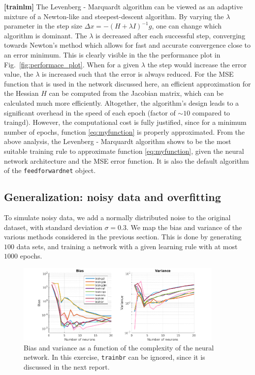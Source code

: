\documentclass[pdftex,11pt,a4paper]{article}
\begin{document}
\textbf{[trainlm]} The Levenberg - Marquardt algorithm can be viewed as an adaptive mixture of a Newton-like and steepest-descent algorithm. By varying the $\lambda$ parameter in the step size $\Delta x = - (H + \lambda I)^{-1} g$, one can change which algorithm is dominant. The $\lambda$ is decreased after each successful step, converging towards Newton's method which allows for fast and accurate convergence close to an error minimum. This is clearly visible in the the performance plot in Fig.~\ref{fig:performace_plot}. When for a given $\lambda$ the step would increase the error value, the $\lambda$ is increased such that the error is always reduced. For the MSE function that is used in the network discussed here, an efficient approximation for the Hessian $H$ can be computed from the Jacobian matrix, which can be calculated much more efficiently. Altogether, the algorithm's design leads to a significant overhead in the speed of each epoch (factor of $\sim 10$ compared to traingd). However, the computational cost is fully justified, since for a minimum number of epochs, function \eqref{eq:myfunction} is properly approximated.
From the above analysis, the Levenberg - Marquardt algorithm shows to be the most suitable training rule to approximate function \eqref{eq:myfunction}, given the neural network architecture and the MSE error function. It is also the default algorithm of the \texttt{feedforwardnet} object.

\subsection{Generalization: noisy data and overfitting}
To simulate noisy data, we add a normally distributed noise to the original dataset, with standard deviation $\sigma = 0.3$. We map the bias and variance of the various methods considered in the previous section. This is done by generating $100$ data sets, and training a network with a given learning rule with at most $1000$ epochs. 
\begin{figure}[hbt]
\centering
\includegraphics[width=0.9\textwidth]{figs/bias_and_variance.png}
\caption{Bias and variance as a function of the complexity of the neural network. In this exercise, \texttt{trainbr} can be ignored, since it is discussed in the next report.\label{fig:bias_and_variance}}
\end{figure}
\end{document}
